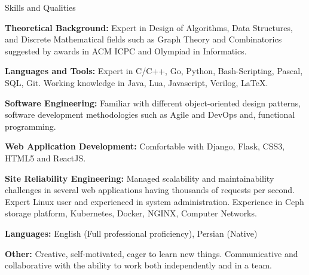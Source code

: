 \documentclass{resume} %
\begin{document}
\begin{rSection}{Skills and Qualities}

	{\bf Theoretical Background:}
	Expert in Design of Algorithms, Data Structures, and Discrete Mathematical fields such as Graph Theory and Combinatorics suggested by awards in ACM ICPC and Olympiad in Informatics.

	{\bf Languages and Tools:}
	Expert in C/C++, Go, Python, Bash-Scripting, Pascal, SQL, Git. Working knowledge in Java, Lua, Javascript, Verilog, \LaTeX.

	{\bf Software Engineering:}
	Familiar with different object-oriented design patterns, software development methodologies such as Agile and DevOps and, functional programming.

	{\bf Web Application Development:}
	Comfortable with Django, Flask, CSS3, HTML5 and ReactJS.

	{\bf Site Reliability Engineering:}
	Managed scalability and maintainability challenges in several web applications having thousands of requests per second.
	Expert Linux user and experienced in system administration.
	Experience in Ceph storage platform, Kubernetes, Docker, NGINX, Computer Networks.

	{\bf Languages:}
	English (Full professional proficiency), Persian (Native)

	{\bf Other:}
	Creative, self-motivated, eager to learn new things. Communicative and collaborative with the ability to work both independently and in a team.

\end{rSection}
	
\end{document}
